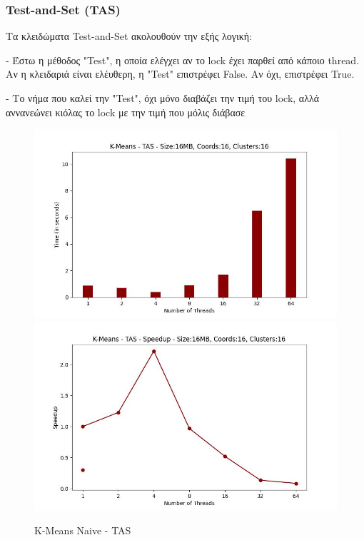 \documentclass[../final_report.tex]{subfiles}
\begin{document}
\subsubsection{Test-and-Set (TAS)}

Τα κλειδώματα Test-and-Set ακολουθούν την εξής λογική:

- Έστω η μέθοδος "Test", η οποία ελέγχει αν το lock έχει παρθεί από κάποιο thread. Αν η κλειδαριά
είναι ελέυθερη, η "Test" επιστρέφει False. Αν όχι, επιστρέφει True.

- Το νήμα που καλεί την "Test", όχι μόνο διαβάζει την τιμή του lock, αλλά αννανεώνει κιόλας το lock 
με την τιμή που μόλις διάβασε

\begin{figure}[H]
    \centering
        \includegraphics[scale=0.4]{outFilesAffinityMouliko/plots/kmeans_locks_tas.jpg}
        \includegraphics[scale=0.4]{outFilesAffinityMouliko/plots/kmeans_locks_tas_speedup.jpg}
    \caption{K-Means Naive - TAS}
    \label{fig:K-Means Naive - TAS}
\end{figure}
\end{document}
